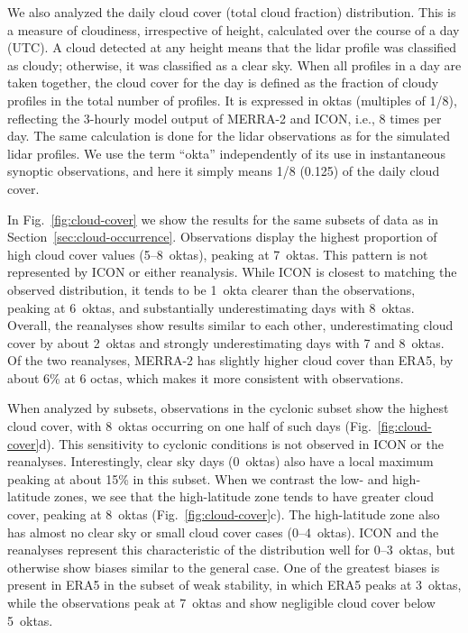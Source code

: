 \documentclass[draft]{agujournal2019}
\begin{document}
We also analyzed the daily cloud cover (total cloud fraction) distribution. This is a measure of cloudiness, irrespective of height, calculated over the course of a day (UTC). A cloud detected at any height means that the lidar profile was classified as cloudy; otherwise, it was classified as a clear sky. When all profiles in a day are taken together, the cloud cover for the day is defined as the fraction of cloudy profiles in the total number of profiles. It is expressed in oktas (multiples of 1/8), reflecting the 3-hourly model output of MERRA-2 and ICON, i.e., 8 times per day. The same calculation is done for the lidar observations as for the simulated lidar profiles. We use the term ``okta'' independently of its use in instantaneous synoptic observations, and here it simply means 1/8 (0.125) of the daily cloud cover.

In Fig.~\ref{fig:cloud-cover} we show the results for the same subsets of data as in Section~\ref{sec:cloud-occurrence}. Observations display the highest proportion of high cloud cover values (5–8~oktas), peaking at 7~oktas. This pattern is not represented by ICON or either reanalysis. While ICON is closest to matching the observed distribution, it tends to be 1~okta clearer than the observations, peaking at 6~oktas, and substantially underestimating days with 8~oktas. Overall, the reanalyses show results similar to each other, underestimating cloud cover by about 2~oktas and strongly underestimating days with 7 and 8~oktas. Of the two reanalyses, MERRA-2 has slightly higher cloud cover than ERA5, by about 6\% at 6 octas, which makes it more consistent with observations.

When analyzed by subsets, observations in the cyclonic subset show the highest cloud cover, with 8~oktas occurring on one half of such days (Fig.~\ref{fig:cloud-cover}d). This sensitivity to cyclonic conditions is not observed in ICON or the reanalyses. Interestingly, clear sky days (0~oktas) also have a local maximum peaking at about 15\% in this subset. When we contrast the low- and high-latitude zones, we see that the high-latitude zone tends to have greater cloud cover, peaking at 8~oktas (Fig.~\ref{fig:cloud-cover}c). The high-latitude zone also has almost no clear sky or small cloud cover cases (0–4~oktas). ICON and the reanalyses represent this characteristic of the distribution well for 0–3~oktas, but otherwise show biases similar to the general case. One of the greatest biases is present in ERA5 in the subset of weak stability, in which ERA5 peaks at 3~oktas, while the observations peak at 7~oktas and show negligible cloud cover below 5~oktas.
\end{document}
